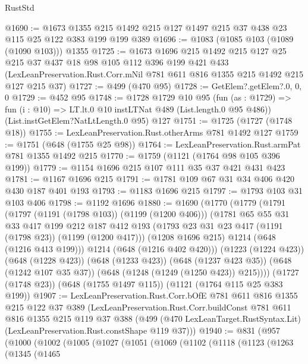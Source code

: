 \begin{lexlean}{RustStd}
\begin{coremodule}
@1690 := @1673 @1355 @215 @1492 @215 @127 @1497 @215 @37 @438 @23 @115 @25 @122 @383 @199 @199 @389
@1696 := @1083 (@1085 @103 (@1089 (@1090 @103))) @1355
@1725 := @1673
    @1696
    @215
    @1492
    @215
    @127
    @25
    @215
    @37
    @437
    @18
    @98
    @105
    @112
    @396
    @199
    @421
    @433
    (LexLeanPreservation.Rust.Corr.mNil @781 @611 @816 @1355 @215 @1492 @215 @127 @215 @37)
@1727 := @499 (@470 @95)
@1728 := GetElem?.getElem?.{0, 0, 0}
@1729 := @452 @95
@1748 := @1728
    @1729
    @10
    @95
    (fun (as : @1729) => fun (i : @10) => LT.lt.{0} @10 instLTNat @489 (List.length.{0} @95 @486))
    (List.instGetElem?NatLtLength.{0} @95)
    @127
@1751 := @1725 (@1727 (@1748 @18))
@1755 := LexLeanPreservation.Rust.otherArms @781 @1492 @127
@1759 := @1751 (@648 (@1755 @25 @98))
@1764 := LexLeanPreservation.Rust.armPat @781 @1355 @1492 @215
@1770 := @1759 (@1121 (@1764 @98 @105 @396 @199))
@1779 := @1154 @1696 @215 @107 @111 @35 @37 @421 @431 @423
@1781 := @1167 @1696 @215
@1791 := @1781 @109 @67 @31 @34 @406 @420 @430 @187 @401 @193
@1793 := @1183 @1696 @215
@1797 := @1793 @103 @31 @103 @406
@1798 := @1192 @1696
@1880 := @1690
    (@1770
      (@1779
        (@1791
          (@1797 (@1191 (@1798 @103)) (@1199 (@1200 @406)))
          (@1781
            @65
            @55
            @31
            @33
            @417
            @199
            @212
            @187
            @412
            @193
            (@1793 @23 @31 @23 @417 (@1191 (@1798 @23)) (@1199 (@1200 @417)))
            (@1208 @1696 @215)
            @1214
            (@648 (@1216 @413 @199)))
          @1214
          (@648 (@1216 @402 @420)))
        (@1223 (@1224 @423))
        (@648 (@1228 @423))
        (@648 (@1233 @423))
        (@648 (@1237 @423 @35))
        (@648 (@1242 @107 @35 @37))
        (@648 (@1248 (@1249 (@1250 @423)) @215))))
    (@1727 (@1748 @23))
    (@648 (@1755 @1497 @115))
    (@1121 (@1764 @115 @25 @383 @199))
@1907 := LexLeanPreservation.Rust.Corr.bOfE
    @781
    @611
    @816
    @1355
    @215
    @122
    @37
    @389
    (LexLeanPreservation.Rust.Corr.buildConst
      @781
      @611
      @816
      @1355
      @215
      @119
      @37
      @388
      (@499 (@470 LexLeanTarget.RustSyntax.Lit) (LexLeanPreservation.Rust.constShape @119 @37)))
@1940 := @831
    (@957
      (@1000
        (@1002
          (@1005
            (@1027
              (@1051
                (@1069
                  (@1102
                    (@1118
                      (@1123
                        (@1263
                          (@1345
                            (@1465

\end{coremodule}
\end{lexlean}
